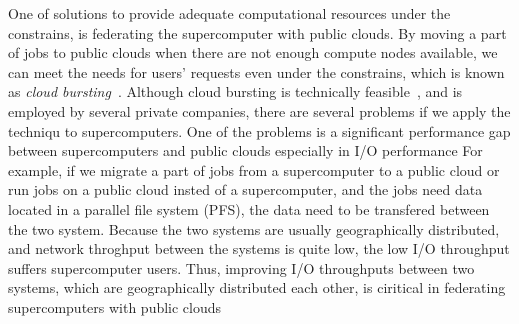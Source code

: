 One of solutions to provide adequate computational resources under the constrains, is federating the supercomputer with public clouds.
By moving a part of jobs to public clouds when there are not enough
compute nodes available, we can meet the needs for users' requests even under the constrains, which is known as \emph{cloud bursting}~\cite{Optimizing_Service_Level_Agreements_for_Autonomic_Cloud_Bursting_Schedulers, A_Framework_for_Data-Intensive_Computing_with_Cloud_Bursting}.
Although cloud bursting is technically feasible~\cite{Eucalyptus,stratos,Seagull}, 
and is employed by several private companies, there are several problems if we apply the techniqu to supercomputers.
One of the problems is a significant performance gap between supercomputers and public clouds especially in I/O performance
For example, if we migrate a part of jobs from a supercomputer to a public cloud or run jobs on a public cloud insted of a supercomputer, and the jobs need data located in a parallel file system (PFS), the data need to be transfered between the two system.
Because the two systems are usually geographically distributed, and network throghput between the systems is quite low,
the low I/O throughput suffers supercomputer users. Thus, improving I/O throughputs between two systems, which are geographically distributed each other, is ciritical in federating supercomputers with public clouds

